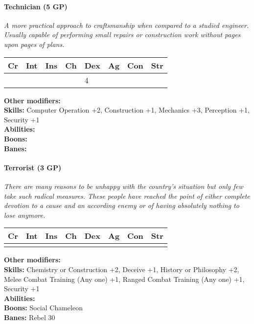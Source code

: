 \hrulefill
\paragraph*{Technician (5 GP)}
\textit{A more practical approach to craftsmanship when compared to a studied engineer. Usually capable of performing small repairs or construction work without pages upon pages of plans.}\par
\begin{tabular}{|l|l|l|l|l|l|l|l|}
    \hline
    Cr & Int & Ins & Ch & Dex & Ag & Con & Str \\ \hline
    &  &  &  & 4 &  &  &  \\ \hline
\end{tabular}\par
\noindent\textbf{Other modifiers:} \\
\textbf{Skills:} Computer Operation +2,
Construction +1,
Mechanics +3,
Perception +1,
Security +1\\
\textbf{Abilities:} \\
\textbf{Boons:} \\
\textbf{Banes:} \\

\hrulefill
\paragraph*{Terrorist (3 GP)}
\textit{There are many reasons to be unhappy with the country's situation but only few take such radical measures. These people have reached the point of either complete devotion to a cause and an according enemy or of having absolutely nothing to lose anymore.}\par
\begin{tabular}{|l|l|l|l|l|l|l|l|}
	\hline
	Cr & Int & Ins & Ch & Dex & Ag & Con & Str \\ \hline
	&  &  &  &  &  &  &  \\ \hline
\end{tabular}\par
\noindent\textbf{Other modifiers:} \\
\textbf{Skills:} Chemistry or Construction +2,
Deceive +1,
History or Philosophy +2,
Melee Combat Training (Any one) +1,
Ranged Combat Training (Any one) +1,
Security +1\\
\textbf{Abilities:} \\
\textbf{Boons:} Social Chameleon\\
\textbf{Banes:} Rebel 30\\

